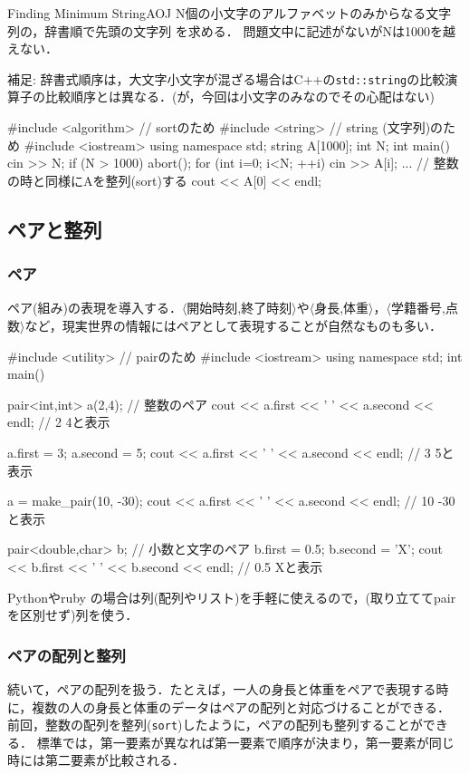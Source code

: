 \begin{psbox}{Finding Minimum String}{AOJ}
N個の小文字のアルファベットのみからなる文字列の，辞書順で先頭の文字列
を求める．
問題文中に記述がないがNは1000を越えない．

\end{psbox}

補足: 辞書式順序は，大文字小文字が混ざる場合はC++の\texttt{std::string}の比較演算子の比較順序とは異なる．(が，今回は小文字のみなのでその心配はない)

\begin{cbox}
#include <algorithm> // sortのため
#include <string> // string (文字列)のため
#include <iostream>
using namespace std;
string A[1000];
int N;
int main() {
    cin >> N;
    if (N > 1000) abort();
    for (int i=0; i<N; ++i) cin >> A[i];
    ... // 整数の時と同様にAを整列(sort)する
    cout << A[0] << endl;
}
\end{cbox}

\subsection{ペアと整列}\label{section:sort-pairs}
\subsubsection{ペア}
ペア(組み)の表現を導入する．$\langle$開始時刻,終了時刻$\rangle$や$\langle$身長,体重$\rangle$，$\langle$学籍番号,点数$\rangle$など，現実世界の情報にはペアとして表現することが自然なものも多い．

\begin{cbox}
#include <utility> // pairのため
#include <iostream>
using namespace std;
int main() {
  pair<int,int> a(2,4); // 整数のペア
  cout << a.first << ' ' << a.second << endl; // 2 4と表示

  a.first = 3;
  a.second = 5;
  cout << a.first << ' ' << a.second << endl; // 3 5と表示

  a = make_pair(10, -30);
  cout << a.first << ' ' << a.second << endl; // 10 -30と表示

  pair<double,char> b; // 小数と文字のペア
  b.first = 0.5;
  b.second = 'X';
  cout << b.first << ' ' << b.second << endl; // 0.5 Xと表示
}
\end{cbox}

Pythonやruby の場合は列(配列やリスト)を手軽に使えるので，(取り立ててpairを区別せず)列を使う．



\subsubsection{ペアの配列と整列}
続いて，ペアの配列を扱う．たとえば，一人の身長と体重をペアで表現する時に，複数の人の身長と体重のデータはペアの配列と対応づけることができる．
前回，整数の配列を整列(\texttt{sort})したように，ペアの配列も整列することができる．
標準では，第一要素が異なれば第一要素で順序が決まり，第一要素が同じ時には第二要素が比較される．


